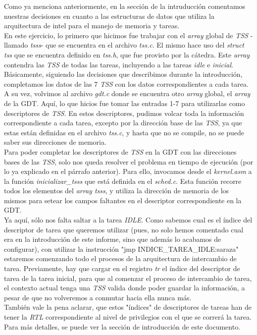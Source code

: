 Como ya menciona anteriormente, en la sección de la intruducción comentamos nuestras decisiones en cuanto a las estructuras de datos que utiliza la arquitectura de intel para el manejo de memoria y tareas.\\

En este ejercicio, lo primero que hicimos fue trabajar con el \textit{array} global de \textit{TSS} -llamado \textit{tsss}- que se encuentra en el archivo \textit{tss.c}. El mismo hace uso del \textit{struct tss} que se encuentra definido en \textit{tss.h}, que fue provisto por la cátedra. Este \textit{array} contendra las \textit{TSS} de todas las tareas, incluyendo a las tareas \textit{idle} e \textit{inicial}. Básicamente, siguiendo las decisiones que describimos durante la introducción, completamos los datos de las 7 \textit{TSS} con los datos correspondientes a cada tarea.\\

A su vez, volvimos al archivo \textit{gdt.c} donde se encuentra otro \textit{array} global, el \textit{array} de la GDT. Aquí, lo que hicios fue tomar las entradas 1-7 para utilizarlas como descriptores de \textit{TSS}. En estos descriptores, pudimos volcar toda la información correspondiente a cada tarea, excepto por la dirección base de las \textit{TSS}, ya que estas están definidas en el archivo \textit{tss.c}, y hasta que no se compile, no se puede saber sus direcciones de memoria.\\

Para poder completar los descriptores de \textit{TSS} en la GDT con las direcciones bases de las \textit{TSS}, solo nos queda resolver el problema en tiempo de ejecución (por lo ya explicado en el párrafo anterior). Para ello, invocamos desde el \textit{kernel.asm} a la función \textit{inicializar\_tsss} que está definida en el \textit{sched.c}. Esta función recorre todos los elementos del \textit{array tsss}, y utiliza la dirección de memoria de los mismos para setear los campos faltantes en el descriptor correspondiente en la GDT.\\

Ya aquí, sólo nos falta saltar a la tarea \textit{IDLE}. Como sabemos cual es el índice del descriptor de tarea que queremos utilizar (pues, no solo hemos comentado cual era en la introducción de este informe, sino que además lo acabamos de configurar), con utilizar la instrucción "jmp INDICE\_TAREA\_IDLE:saraza" estaremos comenzando todo el procesos de la arquitectura de intercambio de tarea. Previamente, hay que cargar en el registro \textit{tr} el índice del descriptor de tarea de la tarea inicial, para que al comenzar el proceso de intercambio de tarea, el contexto actual tenga una \textit{TSS} valida donde poder guardar la información, a pesar de que no volveremos a conmutar hacia ella nunca más.\\

También vale la pena aclarar, que estos "índices" de descriptores de tareas han de tener la \textit{RTL} correspondiente al nivel de privilegios con el que se correrá la tarea. Para más detalles, se puede ver la sección de introducción de este documento.
